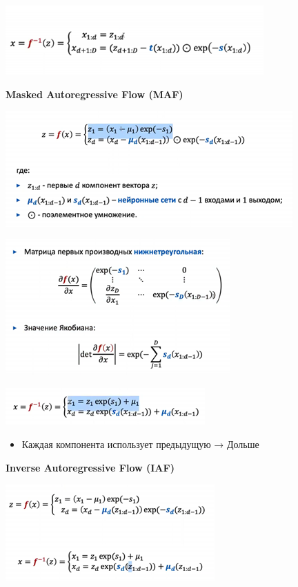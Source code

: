 \documentclass[a4paper, 12pt]{article}
\begin{document}
\includegraphics[width=3.89415in,height=1.04619in]{media/image23.png}

\textbf{{Masked Autoregressive Flow (MAF)}}


\centering \includegraphics[width=4.33333in,height=1.73856in]{media/image8.png}

\centering \includegraphics[width=3.38542in,height=2.04167in]{media/image24.png}

\centering \includegraphics[width=3.01042in,height=0.56250in]{media/image15.png}

\begin{itemize}
\item
  
  Каждая компонента использует предыдущую → Дольше
  
\end{itemize}

\textbf{Inverse Autoregressive Flow (IAF)}


\centering \includegraphics[width=3.15625in,height=1.46648in]{media/image11.png}
\end{document}
